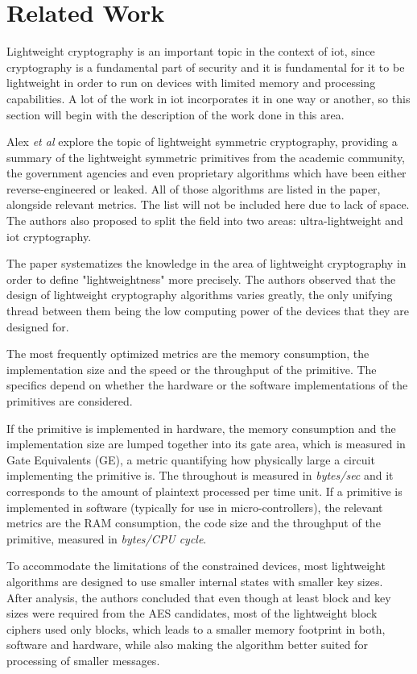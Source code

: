 \documentclass{llncs}
\begin{document}
\section{Related Work}

Lightweight cryptography is an important topic in the context of \gls{iot}, since
cryptography is a fundamental part of security and it is fundamental for it to be
lightweight in order to run on devices with limited memory and processing
capabilities. A lot of the work in \gls{iot} incorporates it in one way or another,
so this section will begin with the description of the work done in this area.

Alex \textit{et al}\cite{Stateoft96:online} explore the topic of lightweight symmetric cryptography,
providing a summary of the lightweight symmetric
primitives from the academic community, the government agencies and even proprietary
algorithms which have been either reverse-engineered or leaked. All of those algorithms
are listed in the paper, alongside relevant metrics. The list will not be
included here due to lack of space. The authors also proposed
to split the field into two areas: ultra-lightweight and \gls{iot} cryptography.

The paper systematizes the knowledge in the area of lightweight cryptography
in order to define "lightweightness" more precisely. The authors observed that the design
of lightweight cryptography algorithms varies greatly, the only unifying thread
between them being the low computing power of the devices that they are designed for.

The most frequently optimized metrics are the memory consumption, the implementation size
and the speed or the throughput of the primitive. The specifics depend on whether
the hardware or the software implementations of the primitives are considered.

If the primitive is implemented in hardware, the memory consumption and the implementation
size are lumped together into its gate area, which is measured in Gate Equivalents (GE),
a metric quantifying how physically large a circuit implementing the primitive is.
The throughout is measured in \textit{bytes/sec} and it corresponds to the amount of plaintext
processed per time unit. If a primitive is implemented in software (typically for
use in micro-controllers), the relevant metrics are the RAM consumption, the code
size and the throughput of the primitive, measured in \textit{bytes/CPU cycle}.

To accommodate the limitations of the constrained devices, most lightweight algorithms
are designed to use smaller internal states with smaller key sizes. After analysis,
the authors concluded that even though at least  block and
key sizes were required from the AES candidates, most of the lightweight
block ciphers used only  blocks, which leads to a smaller memory
footprint in both, software and hardware, while also making the algorithm better suited
for processing of smaller messages.
\end{document}
